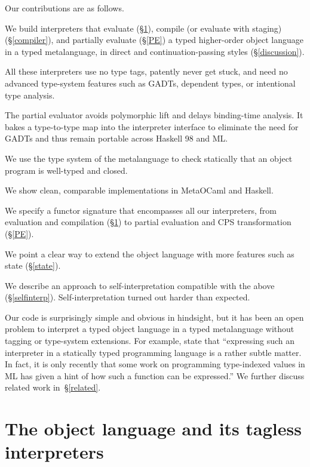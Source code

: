 \documentclass[preprint]{sigplanconf}
\begin{document}
Our contributions are as follows.
\begin{enumerate*}
\item We build interpreters that evaluate (\S\ref{language}),
    compile (or evaluate with staging) (\S\ref{compiler}), and partially evaluate (\S\ref{PE}) a typed higher-order object language
   in a typed metalanguage, in direct and continuation\hyp passing styles
   (\S\ref{discussion}).
\item All these interpreters use no type tags, patently never get stuck,
    and need no advanced type-system features such as GADTs, dependent types,
    or intentional type analysis.
\item The partial evaluator avoids polymorphic lift and delays binding-time
    analysis.  It bakes a type-to-type map into the interpreter
    interface to eliminate the need for GADTs and thus remain portable
    across Haskell 98 and ML.
\item We use the type system of the metalanguage
    to check statically that an object program is well-typed and closed.
\item We show clean, comparable implementations in MetaOCaml and Haskell.
\item We specify a functor signature that encompasses all our interpreters, from
    evaluation and compilation (\S\ref{language}) to partial evaluation and CPS transformation (\S\ref{PE}).
\item We point a clear way to extend the object language with more features
    such as state (\S\ref{state}).
\item We describe an approach to self\hyp interpretation compatible with the
  above (\S\ref{selfinterp}).  Self\hyp interpretation turned out harder than expected.
\end{enumerate*}
Our code is surprisingly simple and obvious in hindsight, but
it has been an open problem to
interpret a typed object language in a typed metalanguage without
tagging or type\hyp system extensions.  For example, \citet{taha-tag}
state that ``expressing such an interpreter in a statically typed
programming language is a rather subtle matter. In fact, it is only
recently that some work on programming type-indexed values in ML
\citep{yang-encoding} has given a hint of how such a function can be
expressed.''  We further discuss related work in~\S\ref{related}.

\section{The object language and its tagless interpreters}\label{language}
\end{document}
